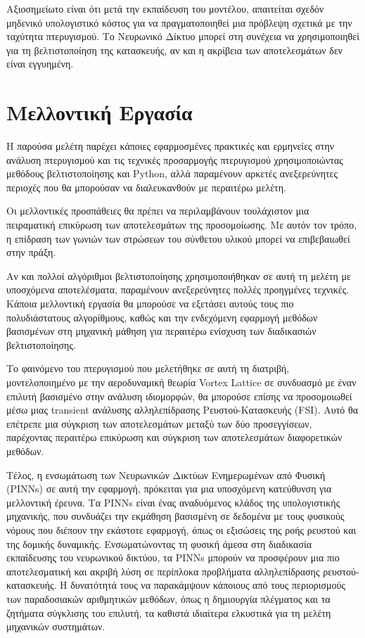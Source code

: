 Αξιοσημείωτο είναι ότι μετά την εκπαίδευση του μοντέλου, απαιτείται σχεδόν μηδενικό
υπολογιστικό κόστος για να πραγματοποιηθεί μια πρόβλεψη σχετικά με την ταχύτητα πτερυγισμού. 
Το Νευρωνικό Δίκτυο μπορεί στη συνέχεια να χρησιμοποιηθεί για τη βελτιστοποίηση της κατασκευής, αν και η ακρίβεια των αποτελεσμάτων δεν είναι εγγυημένη.


\section{Μελλοντική Εργασία}\label{future-work}

Η παρούσα μελέτη παρέχει κάποιες εφαρμοσμένες πρακτικές και ερμηνείες στην ανάλυση πτερυγισμού και τις τεχνικές 
προσαρμογής πτερυγισμού χρησιμοποιώντας μεθόδους βελτιστοποίησης και \textlatin{Python}, αλλά 
παραμένουν αρκετές ανεξερεύνητες περιοχές που θα μπορούσαν να διαλευκανθούν με περαιτέρω μελέτη.

Οι μελλοντικές προσπάθειες θα πρέπει να περιλαμβάνουν τουλάχιστον μια πειραματική 
επικύρωση των αποτελεσμάτων της προσομοίωσης. Με αυτόν τον τρόπο, η επίδραση των 
γωνιών των στρώσεων του σύνθετου υλικού μπορεί να επιβεβαιωθεί στην πράξη.

Αν και πολλοί αλγόριθμοι βελτιστοποίησης χρησιμοποιήθηκαν σε αυτή τη μελέτη με 
υποσχόμενα αποτελέσματα, παραμένουν ανεξερεύνητες πολλές προηγμένες τεχνικές. 
Κάποια μελλοντική εργασία θα μπορούσε να εξετάσει αυτούς τους πιο πολυδιάστατους 
αλγορίθμους, καθώς και την ενδεχόμενη εφαρμογή μεθόδων βασισμένων στη μηχανική μάθηση
για περαιτέρω ενίσχυση των διαδικασιών βελτιστοποίησης.

Το φαινόμενο του πτερυγισμού που μελετήθηκε σε αυτή τη διατριβή, μοντελοποιημένο με 
την αεροδυναμική θεωρία \textlatin{Vortex Lattice} σε συνδυασμό με έναν επιλυτή 
βασισμένο στην ανάλυση ιδιομορφών, θα μπορούσε επίσης να προσομοιωθεί μέσω μιας 
\textlatin{transient} ανάλυσης αλληλεπίδρασης Ρευστού-Κατασκευής \textlatin{(FSI)}. Αυτό θα επέτρεπε μια 
σύγκριση των αποτελεσμάτων μεταξύ των δύο προσεγγίσεων, παρέχοντας περαιτέρω 
επικύρωση και σύγκριση των αποτελεσμάτων διαφορετικών μεθόδων.

Τέλος, η ενσωμάτωση των Νευρωνικών Δικτύων Ενημερωμένων από Φυσική \textlatin{(PINNs)} 
σε αυτή την εφαρμογή, πρόκειται για μια υποσχόμενη κατεύθυνση για μελλοντική έρευνα. 
Τα \textlatin{PINNs} είναι ένας αναδυόμενος κλάδος της υπολογιστικής μηχανικής, που συνδυάζει την εκμάθηση 
βασισμένη σε δεδομένα με τους φυσικούς νόμους που διέπουν την εκάστοτε εφαρμογή, όπως οι εξισώσεις 
της ροής ρευστού και της δομικής δυναμικής. Ενσωματώνοντας τη φυσική άμεσα στη 
διαδικασία εκπαίδευσης του νευρωνικού δικτύου, τα \textlatin{PINNs} μπορούν να προσφέρουν 
μια πιο αποτελεσματική και ακριβή λύση σε περίπλοκα προβλήματα αλληλεπίδρασης 
ρευστού-κατασκευής. Η δυνατότητά τους να παρακάμψουν κάποιους από τους περιορισμούς 
των παραδοσιακών αριθμητικών μεθόδων, όπως η δημιουργία πλέγματος και τα 
ζητήματα σύγκλισης του επιλυτή, τα καθιστά ιδιαίτερα ελκυστικά για τη μελέτη μηχανικών συστημάτων.

